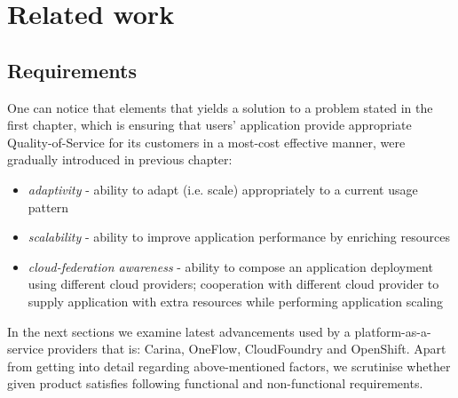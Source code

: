 \chapter{Related work} 


\section{Requirements}
One can notice that elements that yields a solution to a problem stated in the first chapter, which is ensuring that users' application provide appropriate Quality-of-Service for its customers in a most-cost effective manner, were gradually introduced in previous chapter:

\begin{itemize}
	\item \emph{adaptivity} - ability to adapt (i.e. scale) appropriately to a current usage pattern
	\item \emph{scalability} - ability to improve application performance by enriching resources
	\item \emph{cloud-federation awareness} - ability to compose an application deployment using different cloud providers; cooperation with different cloud provider to supply application with extra resources while performing application scaling
\end{itemize}

In the next sections we examine latest advancements used by a platform-as-a-service providers that is: Carina, OneFlow, CloudFoundry and OpenShift. Apart from getting into detail regarding above-mentioned factors, we scrutinise whether given product satisfies following functional and non-functional requirements. 

